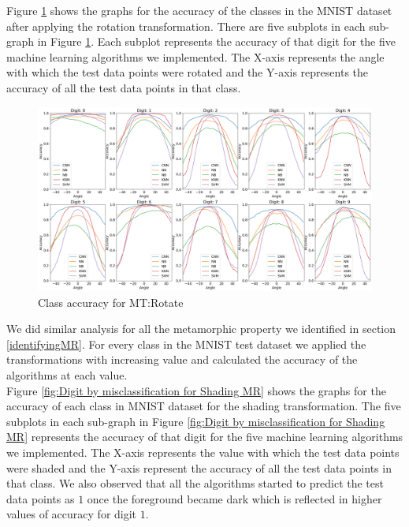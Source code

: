     Figure \ref{fig:Digit by misclassification for Rotation MR} shows the graphs for the accuracy of the classes in the MNIST dataset after applying the rotation transformation. There are five subplots in each sub-graph in Figure \ref{fig:Digit by misclassification for Rotation MR}. Each subplot represents the accuracy of that digit for the five machine learning algorithms we implemented. The X-axis represents the angle with which the test data points were rotated and the Y-axis represents the accuracy of all the test data points in that class.\\
    \begin{figure}[H]
    \centering
        \includegraphics[width=\textwidth]{chapters/results/MT/RotateAll.png}
        \caption{Class accuracy for MT:Rotate}
        \label{fig:Digit by misclassification for Rotation MR}
    \end{figure}
    
    We did similar analysis for all the metamorphic property we identified in section \ref{identifyingMR}. For every class in the MNIST test dataset we applied the transformations with increasing value and calculated the accuracy of the algorithms at each value.\\
    Figure \ref{fig:Digit by misclassification for Shading MR} shows the graphs for the accuracy of each class in MNIST dataset for the shading transformation. The five subplots in each sub-graph in Figure \ref{fig:Digit by misclassification for Shading MR} represents the accuracy of that digit for the five machine learning algorithms we implemented. The X-axis represents the value with which the test data points were shaded and the Y-axis represent the accuracy of all the test data points in that class. We also observed that all the algorithms started to predict the test data points as $1$ once the foreground became dark which is reflected in higher values of accuracy for digit $1$. \\
        
